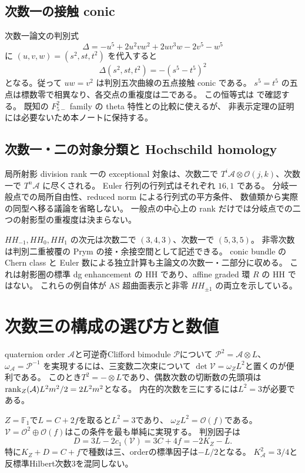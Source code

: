\documentclass[11pt,a4paper]{ltjsarticle}
\begin{document}
\subsection{次数一の接触 conic}
次数一論文の判別式
\[
 \Delta=-u^5+2u^2vw^2+2uv^3w-2v^5-w^5
\]
に $(u,v,w)=(s^2,st,t^2)$ を代入すると
\[
 \Delta(s^2,st,t^2)=-(s^5-t^5)^2
\]
となる。従って $uw=v^2$ は判別五次曲線の五点接触 conic である。
$s^5=t^5$ の五点は標数零で相異なり、各交点の重複度は二である。
この恒等式は  で確認する。
既知の $F_{5-}^{2}$ family の theta 特性との比較に使えるが、
非表示定理の証明には必要ないため本ノートに保持する。

\subsection{次数一・二の対象分類と Hochschild homology}
局所射影 division rank 一の exceptional 対象は、次数二で
$T^i\mathcal A\otimes\mathcal O(j,k)$、次数一で $T^n\mathcal A$ に尽くされる。
Euler 行列の行列式はそれぞれ $16,1$ である。
分岐一般点での局所自由性、reduced norm による行列式の平方条件、
数値類から実際の同型へ移る議論を省略しない。
一般点の中心上の rank だけでは分岐点での二つの射影型の重複度は決まらない。

$HH_{-1},HH_0,HH_1$ の次元は次数二で $(3,4,3)$、次数一で $(5,3,5)$。
非零次数は判別二重被覆の Prym の接・余接空間として記述できる。
conic bundle の Chern class と Euler 数による独立計算も主論文の次数一・二部分に収める。
これは射影圏の標準 dg enhancement の HH であり、affine graded 環 $R$ の HH ではない。
これらの例自体が AS 超曲面表示と非零 $HH_{\pm1}$ の両立を示している。

\section{次数三の構成の選び方と数値}
quaternion order $\mathcal A$と可逆奇Clifford bimodule $\mathcal P$について
$\mathcal P^2=\mathcal A\otimes L$、$\omega_{\mathcal A}=\mathcal P^{-1}$
を実現するには、三変数二次束について
$\det\mathcal V=\omega_ZL^2$と置くのが便利である。
このとき$T^2=-\otimes L$であり、偶数次数の切断数の先頭項は
$\operatorname{rank}_Z(\mathcal A)L^2m^2/2=2L^2m^2$となる。
内在的次数を三にするには$L^2=3$が必要である。

$Z=\mathbb F_1$で$L=C+2f$を取ると$L^2=3$であり、
$\omega_ZL^2=\mathcal O(f)$である。
$\mathcal V=\mathcal O^2\oplus\mathcal O(f)$はこの条件を最も単純に実現する。
判別因子は
\[
D=3L-2c_1(\mathcal V)=3C+4f=-2K_Z-L.
\]
特に$K_Z+D=C+f$で種数は三、orderの標準因子は$-L/2$となる。
$K_{\mathcal A}^2=3/4$と反標準Hilbert次数$3$を混同しない。
\end{document}
